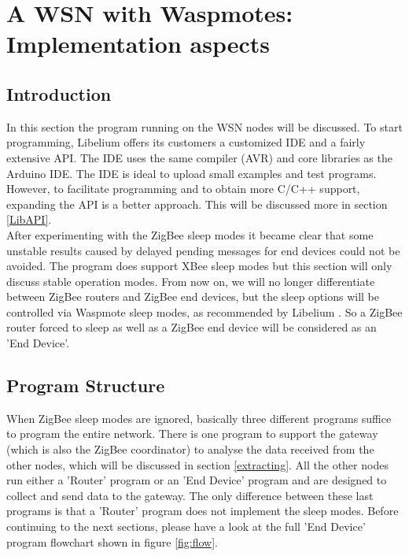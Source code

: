 \section{A WSN with Waspmotes: Implementation aspects}
\subsection{Introduction}
In this section the program running on the WSN nodes will be discussed. To start programming, Libelium offers its customers a customized IDE and a fairly extensive API. The IDE uses the same compiler (AVR) and core libraries as the Arduino IDE. The IDE is ideal to upload small examples and test programs. However, to facilitate programming and to obtain more C/C++ support, expanding the API is a better approach. This will be discussed more in section \ref{LibAPI}.\\
After experimenting with the ZigBee sleep modes it became clear that some unstable results caused by delayed pending messages for end devices could not be avoided. The program does support XBee sleep modes but this section will only discuss stable operation modes. From now on, we will no longer differentiate between ZigBee routers and ZigBee end devices, but the sleep options will be controlled via Waspmote sleep modes, as recommended by Libelium . So a ZigBee router forced to sleep as well as a ZigBee end device will be considered as an 'End Device'. 


\subsection{Program Structure}
When ZigBee sleep modes are ignored, basically three different programs suffice to program the entire network. There is one program to support the gateway (which is also the ZigBee coordinator) to analyse the data received from the other nodes, which will be discussed in section \ref{extracting}. All the other nodes run either a 'Router' program or an 'End Device' program and are designed to collect and send data to the gateway. The only difference between these last programs is that a 'Router' program does not implement the sleep modes. Before continuing to the next sections, please have a look at the full 'End Device' program flowchart shown in figure \ref{fig:flow}.

